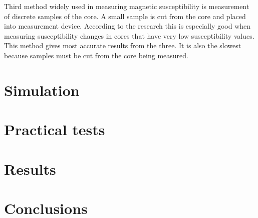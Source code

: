 \documentclass[12pt,a4paper,oneside,pdftex]{report}
\begin{document}
Third method widely used in measuring magnetic susceptibility is measurement
of discrete samples of the core. A small sample is cut from the
core and placed into measurement device. According to the research\cite{Nowaczyk2001} this
is especially good when measuring susceptibility changes in cores that have
very low susceptibility values. This method gives most accurate results from
the three. It is also the slowest because samples must be cut from the core
being measured.\cite{Nowaczyk2001}











% 

% 

\chapter{Simulation}
\label{chapter:simulation}



% 

\chapter{Practical tests}
\label{chapter:Practical tests}

% 

\chapter{Results}
\label{chapter:results}

% 

\chapter{Conclusions}
\label{chapter:conclusions}
\end{document}
